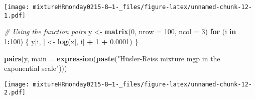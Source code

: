 \documentclass[
]{article}
\newenvironment{Shaded}{\begin{snugshade}}{\end{snugshade}}
\newcommand{\AttributeTok}[1]{\textcolor[rgb]{0.13,0.29,0.53}{#1}}
\newcommand{\CommentTok}[1]{\textcolor[rgb]{0.56,0.35,0.01}{\textit{#1}}}
\newcommand{\ControlFlowTok}[1]{\textcolor[rgb]{0.13,0.29,0.53}{\textbf{#1}}}
\newcommand{\DecValTok}[1]{\textcolor[rgb]{0.00,0.00,0.81}{#1}}
\newcommand{\FloatTok}[1]{\textcolor[rgb]{0.00,0.00,0.81}{#1}}
\newcommand{\FunctionTok}[1]{\textcolor[rgb]{0.13,0.29,0.53}{\textbf{#1}}}
\newcommand{\NormalTok}[1]{#1}
\newcommand{\OtherTok}[1]{\textcolor[rgb]{0.56,0.35,0.01}{#1}}
\newcommand{\SpecialCharTok}[1]{\textcolor[rgb]{0.81,0.36,0.00}{\textbf{#1}}}
\newcommand{\StringTok}[1]{\textcolor[rgb]{0.31,0.60,0.02}{#1}}
\begin{document}
\texttt{[image: mixtureHRmonday0215-8--1-\_files/figure-latex/unnamed-chunk-12-1.pdf]}

\begin{Shaded}
\begin{Highlighting}[]
\CommentTok{\# Using the function pairs}
\NormalTok{y }\OtherTok{\textless{}{-}} \FunctionTok{matrix}\NormalTok{(}\DecValTok{0}\NormalTok{, }\AttributeTok{nrow =} \DecValTok{100}\NormalTok{, }\AttributeTok{ncol =} \DecValTok{3}\NormalTok{)}
\ControlFlowTok{for}\NormalTok{ (i }\ControlFlowTok{in} \DecValTok{1}\SpecialCharTok{:}\DecValTok{100}\NormalTok{) \{}
\NormalTok{  y[i, ] }\OtherTok{\textless{}{-}} \FunctionTok{log}\NormalTok{(x[, i] }\SpecialCharTok{+} \DecValTok{1} \SpecialCharTok{+} \FloatTok{0.0001}\NormalTok{)}
\NormalTok{\}}


\FunctionTok{pairs}\NormalTok{(y, }\AttributeTok{main =} \FunctionTok{expression}\NormalTok{(}\FunctionTok{paste}\NormalTok{(}\StringTok{"Hüsler{-}Reiss mixture mgp in the exponential scale"}\NormalTok{)))}
\end{Highlighting}
\end{Shaded}

\texttt{[image: mixtureHRmonday0215-8--1-\_files/figure-latex/unnamed-chunk-12-2.pdf]}
\end{document}
